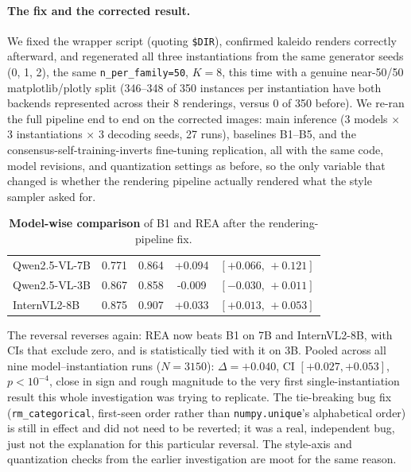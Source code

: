 \documentclass[11pt]{article}
\newcommand{\rea}{\mathrm{REA}}
\begin{document}
\paragraph{The fix and the corrected result.} We fixed the wrapper script (quoting \texttt{\$DIR}), confirmed kaleido renders correctly afterward, and regenerated all three instantiations from the same generator seeds (0, 1, 2), the same \texttt{n\_per\_family=50}, $K{=}8$, this time with a genuine near-50/50 matplotlib/plotly split (346--348 of 350 instances per instantiation have both backends represented across their 8 renderings, versus 0 of 350 before). We re-ran the full pipeline end to end on the corrected images: main inference (3 models $\times$ 3 instantiations $\times$ 3 decoding seeds, 27 runs), baselines B1--B5, and the consensus-self-training-inverts fine-tuning replication, all with the same code, model revisions, and quantization settings as before, so the only variable that changed is whether the rendering pipeline actually rendered what the style sampler asked for.




\begin{table}[t]
\centering
\caption{\textbf{Model-wise comparison} of B1 and $\rea$ after the rendering-pipeline fix.}
\label{tab:model_comparison}
\small
\setlength{\tabcolsep}{3.5pt}
\renewcommand{\arraystretch}{1.08}
\begin{tabular}{
@{}l
S[table-format=1.3]
S[table-format=1.3]
S[table-format=+1.3]
c@{}
}
\toprule
{} &
{} &
{\kilth{$\rea$}} &
{\kilth{$\Delta$}} &
{} \\
\midrule
Qwen2.5-VL-7B & 0.771 & 0.864 & +0.094 & $[+0.066,\,+0.121]$ \\
Qwen2.5-VL-3B & 0.867 & 0.858 & -0.009 & $[-0.030,\,+0.011]$ \\
InternVL2-8B  & 0.875 & 0.907 & +0.033 & $[+0.013,\,+0.053]$ \\
\bottomrule
\end{tabular}
\end{table}




The reversal reverses again: $\rea$ now beats B1 on 7B and InternVL2-8B, with CIs that exclude zero, and is statistically tied with it on 3B. Pooled across all nine model--instantiation runs ($N{=}3150$): $\Delta = +0.040$, CI $[+0.027,+0.053]$, $p<10^{-4}$, close in sign and rough magnitude to the very first single-instantiation result this whole investigation was trying to replicate. The tie-breaking bug fix (\texttt{rm\_categorical}, first-seen order rather than \texttt{numpy.unique}'s alphabetical order) is still in effect and did not need to be reverted; it was a real, independent bug, just not the explanation for this particular reversal. The style-axis and quantization checks from the earlier investigation are moot for the same reason.
\end{document}
